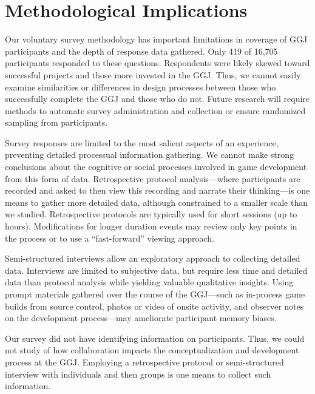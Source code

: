 \documentclass{sig-alternate}
\begin{document}
\section{Methodological Implications}
Our voluntary survey methodology has important limitations in coverage of GGJ participants and the depth of response data gathered. Only 419 of 16,705 participants responded to these questions. Respondents were likely skewed toward successful projects and those more invested in the GGJ. Thus, we cannot easily examine similarities or differences in design processes between those who successfully complete the GGJ and those who do not. Future research will require methods to automate survey administration and collection or ensure randomized sampling from participants.

Survey responses are limited to the most salient aspects of an experience, preventing detailed processual information gathering. We cannot make strong conclusions about the cognitive or social processes involved in game development from this form of data. Retrospective protocol analysis---where participants are recorded and asked to then view this recording and narrate their thinking---is one means to gather more detailed data, although constrained to a smaller scale than we studied. Retrospective protocols are typically used for short sessions (up to hours). Modifications for longer duration events may review only key points in the process or to use a ``fast-forward'' viewing approach. 

Semi-structured interviews allow an exploratory approach to collecting detailed data. Interviews are limited to subjective data, but require less time and detailed data than protocol analysis while yielding valuable qualitative insights. Using prompt materials gathered over the course of the GGJ---such as in-process game builds from source control, photos or video of onsite activity, and observer notes on the development process---may ameliorate participant memory biases.

Our survey did not have identifying information on participants. Thus, we could not study of how collaboration impacts the conceptualization and development process at the GGJ. Employing a retrospective protocol or semi-structured interview with individuals and then groups is one means to collect such information.
\end{document}

